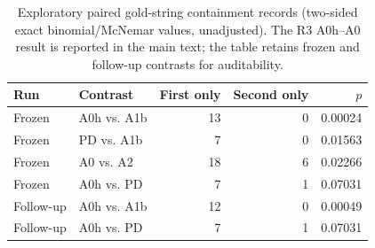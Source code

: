 \begin{table}[t]
\centering\small
\caption{Exploratory paired gold-string containment records (two-sided exact
binomial/McNemar values, unadjusted). The R3 A0h--A0 result is reported in the
main text; the table retains frozen and follow-up contrasts for auditability.}
\label{tab:s-paired-data}
\begin{tabular}{llrrr}
\toprule
Run & Contrast & First only & Second only & $p$ \\
\midrule
Frozen & A0h vs. A1b & 13 & 0 & 0.00024 \\
Frozen & PD vs. A1b & 7 & 0 & 0.01563 \\
Frozen & A0 vs. A2 & 18 & 6 & 0.02266 \\
Frozen & A0h vs. PD & 7 & 1 & 0.07031 \\
Follow-up & A0h vs. A1b & 12 & 0 & 0.00049 \\
Follow-up & A0h vs. PD & 7 & 1 & 0.07031 \\
\bottomrule
\end{tabular}
\end{table}
